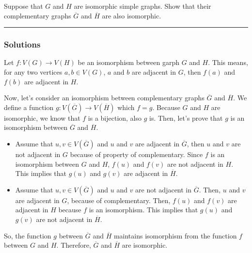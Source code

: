 \newpage
\begin{question}
Suppose that $G$ and $H$ are isomorphic simple graphs. Show that their complementary graphs $\overline{G}$ and $\overline{H}$ are also isomorphic.
\end{question}

\par\noindent\rule{\textwidth}{0.5pt}

\subsubsection*{Solutions}

Let $f: V(G) \to V(H)$ be an isomorphism between garph $G$ and $H$. This means, for any two vertices $a, b \in V(G)$, $a$ and $b$ are adjacent in $G$, then $f(a)$ and $f(b)$ are adjacent in $H$.
\bigskip

Now, let's consider an isomorphism between complementary graphs $\overline{G}$ and $\overline{H}$. We define a function $g: V(\overline{G}) \to V(\overline{H})$ which $f = g$. Because $G$ and $H$ are isomorphic, we know that $f$ is a bijection, also $g$ is. Then, let's prove that $g$ is an isomorphism between $\overline{G}$ and $\overline{H}$.

\begin{itemize}
  \item Assume that $u, v \in V(\overline{G})$ and $u$ and $v$ are adjacent in $\overline{G}$, then $u$ and $v$ are not adjacent in $G$ because of property of complementary. Since $f$ is an isomorphism between $G$ and $H$, $f(u)$ and $f(v)$ are not adjacent in $H$. This implies that $g(u)$ and $g(v)$ are adjacent in $\overline{H}$.
  \item Assume that $u, v \in V(\overline G)$ and $u$ and $v$ are not adjacent in $\overline G$. Then, $u$ and $v$ are adjacent in $G$, because of complementary. Then, $f(u)$ and $f(v)$ are adjacent in $H$ because $f$ is an isomorphism. This implies that $g(u)$ and $g(v)$ are not adjacent in $\overline{H}$.
\end{itemize}

So, the function $g$ between $\overline{G}$ and $\overline{H}$ maintains isomorphism from the function $f$ between $G$ and $H$. Therefore, $\overline{G}$ and $\overline{H}$ are isomorphic.